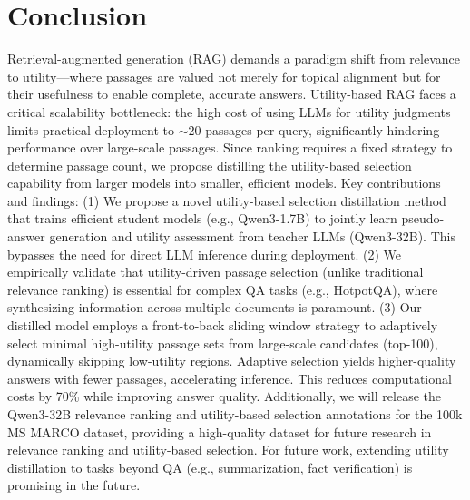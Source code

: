\section{Conclusion} 
Retrieval-augmented generation (RAG) demands a paradigm shift from relevance to utility—where passages are valued not merely for topical alignment but for their usefulness to enable complete, accurate answers. 
Utility-based RAG faces a critical scalability bottleneck: the high cost of using LLMs for utility judgments limits practical deployment to $\sim$20 passages per query, significantly hindering performance over large-scale passages.   
Since ranking requires a fixed strategy to determine passage count, we propose distilling the utility-based selection capability from larger models into smaller, efficient models. 
Key contributions and findings:
(1) We propose a novel utility-based selection distillation method that trains efficient student models (e.g., Qwen3-1.7B) to jointly learn pseudo-answer generation and utility assessment from teacher LLMs (Qwen3-32B). This bypasses the need for direct LLM inference during deployment. 
(2) We empirically validate that utility-driven passage selection (unlike traditional relevance ranking) is essential for complex QA tasks (e.g., HotpotQA), where synthesizing information across multiple documents is paramount. 
(3) Our distilled model employs a front-to-back sliding window strategy to adaptively select minimal high-utility passage sets from large-scale candidates (top-100), dynamically skipping low-utility regions. 
Adaptive selection yields higher-quality answers with fewer passages, accelerating inference. This reduces computational costs by 70\% while improving answer quality. 
Additionally, we will release the Qwen3-32B relevance ranking and utility-based selection annotations for the 100k MS MARCO dataset, providing a high-quality dataset for future research in relevance ranking and utility-based selection. 
For future work, extending utility distillation to tasks beyond QA (e.g., summarization, fact verification) is promising in the future. 




